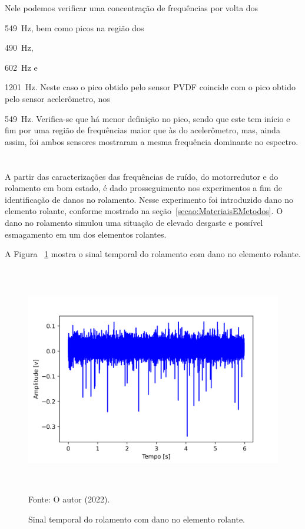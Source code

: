 \documentclass[
	12pt,				
	oneside,			
	a4paper,			
	english,			
	brazil,			
	]{abntex2ppgsi}
\begin{document}
{{{{{{{{{{{Nele podemos verificar uma concentração de frequências por volta dos {\SI{549}{\hertz}, bem como picos na região dos {\SI{490}{\hertz}, {\SI{602}{\hertz} e {\SI{1201}{\hertz}. Neste caso o pico obtido pelo sensor PVDF coincide com o pico obtido pelo sensor acelerômetro, nos {\SI{549}{\hertz}. Verifica-se que há menor definição no pico, sendo que este tem início e fim por uma região de frequências maior que às do acelerômetro, mas, ainda assim, foi ambos sensores mostraram a mesma frequência dominante no espectro. 

\newpage
\section{}

A partir das caracterizações das frequências de ruído, do motorredutor e do rolamento em bom estado, é dado prosseguimento nos experimentos a fim de identificação de danos no rolamento. Nesse experimento foi introduzido dano no elemento rolante, conforme mostrado na seção~\ref{secao:MateriaisEMetodos}. O dano no rolamento simulou uma situação de elevado desgaste e possível esmagamento em um dos elementos rolantes. 

A Figura ~\ref{DEFEITO_ELEMENTO_ROLANTE} mostra o sinal temporal do rolamento com dano no elemento rolante. 

\begin{figure}[H]
\centering
\caption {Sinal temporal do rolamento com dano no elemento rolante.}
\includegraphics[width=\textwidth,height=100mm,keepaspectratio]{aquisicao_06_dano_rolante_11_03_2022_13h48min_2560samples_ajustado_impactos_6s} \\
Fonte: O autor (2022).
\label{DEFEITO_ELEMENTO_ROLANTE}
\end{figure} 

}}}}}}}}}}}}}}}}
\end{document}
